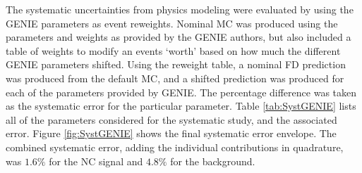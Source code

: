 The systematic uncertainties from physics modeling were evaluated by using the GENIE parameters as event reweights. Nominal MC was produced using the parameters and weights as provided by the GENIE authors, but also included a table of weights to modify an events `worth' based on how much the different GENIE parameters shifted. Using the reweight table, a nominal FD prediction was produced from the default MC, and a shifted prediction was produced for each of the parameters provided by GENIE. The percentage difference was taken as the systematic error for the particular parameter. Table \ref{tab:SystGENIE} lists all of the parameters considered for the systematic study, and the associated error. Figure \ref{fig:SystGENIE} shows the final systematic error envelope. The combined systematic error, adding the individual contributions in quadrature, was $1.6\%$ for the NC signal and $4.8\%$ for the background.

